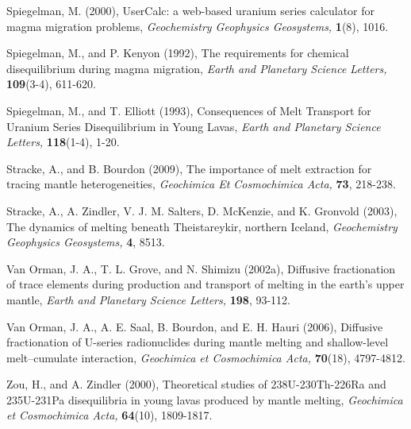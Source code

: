 \documentclass[11pt]{article}
\begin{document}
Spiegelman, M. (2000), UserCalc: a web-based uranium series calculator
for magma migration problems, \emph{Geochemistry Geophysics Geosystems,}
\textbf{1}(8), 1016.

Spiegelman, M., and P. Kenyon (1992), The requirements for chemical
disequilibrium during magma migration, \emph{Earth and Planetary Science
Letters,} \textbf{109}(3-4), 611-620.

Spiegelman, M., and T. Elliott (1993), Consequences of Melt Transport
for Uranium Series Disequilibrium in Young Lavas, \emph{Earth and
Planetary Science Letters,} \textbf{118}(1-4), 1-20.

Stracke, A., and B. Bourdon (2009), The importance of melt extraction
for tracing mantle heterogeneities, \emph{Geochimica Et Cosmochimica
Acta,} \textbf{73}, 218-238.

Stracke, A., A. Zindler, V. J. M. Salters, D. McKenzie, and K. Gronvold
(2003), The dynamics of melting beneath Theistareykir, northern Iceland,
\emph{Geochemistry Geophysics Geosystems,} \textbf{4}, 8513.

Van Orman, J. A., T. L. Grove, and N. Shimizu (2002a), Diffusive
fractionation of trace elements during production and transport of
melting in the earth's upper mantle, \emph{Earth and Planetary Science
Letters,} \textbf{198}, 93-112.

Van Orman, J. A., A. E. Saal, B. Bourdon, and E. H. Hauri (2006),
Diffusive fractionation of U-series radionuclides during mantle melting
and shallow-level melt--cumulate interaction, \emph{Geochimica et
Cosmochimica Acta,} \textbf{70}(18), 4797-4812.

Zou, H., and A. Zindler (2000), Theoretical studies of 238U-230Th-226Ra
and 235U-231Pa disequilibria in young lavas produced by mantle melting,
\emph{Geochimica et Cosmochimica Acta,} \textbf{64}(10), 1809-1817.


    
    
    
\end{document}
